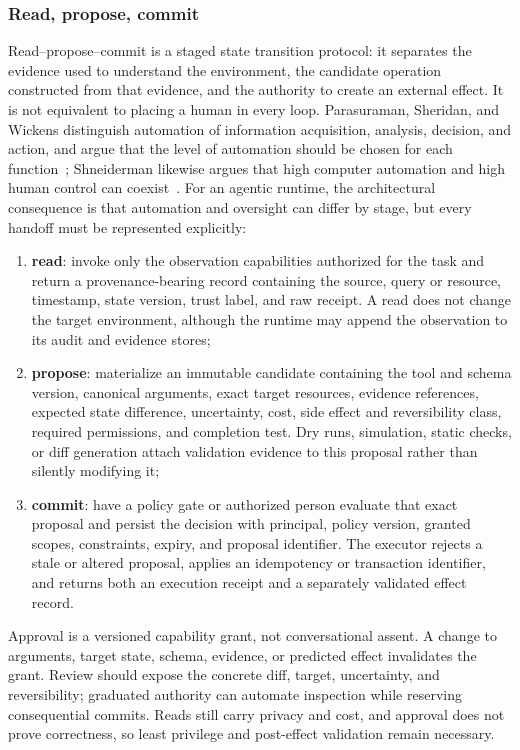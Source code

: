 \subsubsection{Read, propose, commit}

Read--propose--commit is a staged state transition protocol: it separates the evidence used to understand the environment, the candidate operation constructed from that evidence, and the authority to create an external effect. It is not equivalent to placing a human in every loop. Parasuraman, Sheridan, and Wickens distinguish automation of information acquisition, analysis, decision, and action, and argue that the level of automation should be chosen for each function~\cite{parasuraman2000levels}; Shneiderman likewise argues that high computer automation and high human control can coexist~\cite{shneiderman2020hcai}. For an agentic runtime, the architectural consequence is that automation and oversight can differ by stage, but every handoff must be represented explicitly:
\begin{enumerate}
    \item \textbf{read}: invoke only the observation capabilities authorized for the task and return a provenance-bearing record containing the source, query or resource, timestamp, state version, trust label, and raw receipt. A read does not change the target environment, although the runtime may append the observation to its audit and evidence stores;
    \item \textbf{propose}: materialize an immutable candidate containing the tool and schema version, canonical arguments, exact target resources, evidence references, expected state difference, uncertainty, cost, side effect and reversibility class, required permissions, and completion test. Dry runs, simulation, static checks, or diff generation attach validation evidence to this proposal rather than silently modifying it;
    \item \textbf{commit}: have a policy gate or authorized person evaluate that exact proposal and persist the decision with principal, policy version, granted scopes, constraints, expiry, and proposal identifier. The executor rejects a stale or altered proposal, applies an idempotency or transaction identifier, and returns both an execution receipt and a separately validated effect record.
\end{enumerate}
Approval is a versioned capability grant, not conversational assent. A change to arguments, target state, schema, evidence, or predicted effect invalidates the grant. Review should expose the concrete diff, target, uncertainty, and reversibility; graduated authority can automate inspection while reserving consequential commits. Reads still carry privacy and cost, and approval does not prove correctness, so least privilege and post-effect validation remain necessary.

